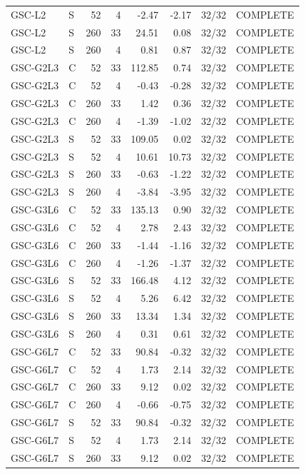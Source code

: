 \documentclass[10pt,a4paper]{article}
\begin{document}
\begin{longtable}{llrrrrrl}
GSC-L2 & S & 52 & 4 & -2.47 & -2.17 & 32/32 & COMPLETE \\
GSC-L2 & S & 260 & 33 & 24.51 & 0.08 & 32/32 & COMPLETE \\
GSC-L2 & S & 260 & 4 & 0.81 & 0.87 & 32/32 & COMPLETE \\
GSC-G2L3 & C & 52 & 33 & 112.85 & 0.74 & 32/32 & COMPLETE \\
GSC-G2L3 & C & 52 & 4 & -0.43 & -0.28 & 32/32 & COMPLETE \\
GSC-G2L3 & C & 260 & 33 & 1.42 & 0.36 & 32/32 & COMPLETE \\
GSC-G2L3 & C & 260 & 4 & -1.39 & -1.02 & 32/32 & COMPLETE \\
GSC-G2L3 & S & 52 & 33 & 109.05 & 0.02 & 32/32 & COMPLETE \\
GSC-G2L3 & S & 52 & 4 & 10.61 & 10.73 & 32/32 & COMPLETE \\
GSC-G2L3 & S & 260 & 33 & -0.63 & -1.22 & 32/32 & COMPLETE \\
GSC-G2L3 & S & 260 & 4 & -3.84 & -3.95 & 32/32 & COMPLETE \\
GSC-G3L6 & C & 52 & 33 & 135.13 & 0.90 & 32/32 & COMPLETE \\
GSC-G3L6 & C & 52 & 4 & 2.78 & 2.43 & 32/32 & COMPLETE \\
GSC-G3L6 & C & 260 & 33 & -1.44 & -1.16 & 32/32 & COMPLETE \\
GSC-G3L6 & C & 260 & 4 & -1.26 & -1.37 & 32/32 & COMPLETE \\
GSC-G3L6 & S & 52 & 33 & 166.48 & 4.12 & 32/32 & COMPLETE \\
GSC-G3L6 & S & 52 & 4 & 5.26 & 6.42 & 32/32 & COMPLETE \\
GSC-G3L6 & S & 260 & 33 & 13.34 & 1.34 & 32/32 & COMPLETE \\
GSC-G3L6 & S & 260 & 4 & 0.31 & 0.61 & 32/32 & COMPLETE \\
GSC-G6L7 & C & 52 & 33 & 90.84 & -0.32 & 32/32 & COMPLETE \\
GSC-G6L7 & C & 52 & 4 & 1.73 & 2.14 & 32/32 & COMPLETE \\
GSC-G6L7 & C & 260 & 33 & 9.12 & 0.02 & 32/32 & COMPLETE \\
GSC-G6L7 & C & 260 & 4 & -0.66 & -0.75 & 32/32 & COMPLETE \\
GSC-G6L7 & S & 52 & 33 & 90.84 & -0.32 & 32/32 & COMPLETE \\
GSC-G6L7 & S & 52 & 4 & 1.73 & 2.14 & 32/32 & COMPLETE \\
GSC-G6L7 & S & 260 & 33 & 9.12 & 0.02 & 32/32 & COMPLETE \\

\end{longtable}
\end{document}
